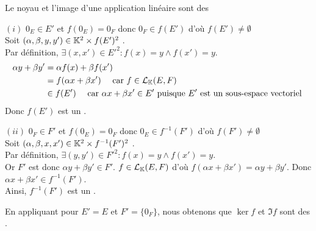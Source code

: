 \documentclass{article}
\renewenvironment{question_kholle}[2][ ]
{
	\subsection{\texorpdfstring{#2}{}}
	\notblank{#1}
	{
		\noindent #1
		\bigbreak
	}
	{}
	\begin{proof}
}
{
	\end{proof}
}
\begin{document}
	\begin{question_kholle}
		[Soit $f \in \mathcal{L}_\K(E, F)$.
		\begin{equation}
			\begin{aligned}
				\ker f &= \left\{ x \in E \;|\; f(x) = 0_F \right\} = f^{-1} (\{0_F\}) \\
				\Im f &= \left\{ y \in F \;|\; \exists x \in E : f(x) = y \right\}
			\end{aligned}
		\end{equation}
		Nous démontrerons le résultat plus général suivant :
		\begin{propositions}
			\item $f(E')$ est un \sev de $F$.
			\item $f^{-1}(F')$ est un \sev de $E$.
		\end{propositions}
		]
		{Le noyau et l'image d'une application linéaire sont des \sevs}

		$(i)$ $0_E \in E'$ et $f(0_E) = 0_F$ donc $0_F \in f(E')$ d'où $f(E') \neq \emptyset$ \\
		Soit $(\alpha, \beta, y, y') \in \mathbb K^2 \times f(E')^2$ \fqs. \\
		Par définition, $\exists (x, x') \in E'^2 : f(x) = y \wedge f(x') = y$.
		\begin{equation*}
			\begin{aligned}
				\alpha y + \beta y'
				&= \alpha f(x) + \beta f(x') \\
				&= f( \alpha x + \beta x' ) \quad \text{ car } f \in \mathcal{L}_{\mathbb K}(E, F) \\
				&\in f(E') \quad \text{ car } \alpha x + \beta x' \in E' \text{ puisque } E' \text{ est un sous-espace vectoriel }
			\end{aligned}
		\end{equation*}
		Donc $f(E')$ est un \sev.

		$(ii)$ $0_F \in F'$ et $f(0_E) = 0_F$ donc $0_E \in f^{-1}(F')$ d'où $f(F') \neq \emptyset$ \\
		Soit $(\alpha, \beta, x, x') \in \mathbb K^2 \times f^{-1}(F')^2$ \fqs. \\
		Par définition, $\exists (y, y') \in F'^2 : f(x) = y \wedge f(x') = y$. \\
		Or $F'$ est \sev donc $\alpha y + \beta y' \in F'$. $f \in \mathcal{L}_\K(E, F)$ d'où $f(\alpha x + \beta x') = \alpha y + \beta y'$. Donc $\alpha x + \beta x' \in f^{-1}(F')$. \\
		Ainsi, $f^{-1}(F')$ est un \sev.

		En appliquant pour $E' = E$ et $F' = \{0_F\}$, nous obtenons que $\ker f$ et $\Im f$ sont des \sevs.
	\end{question_kholle}
\end{document}
